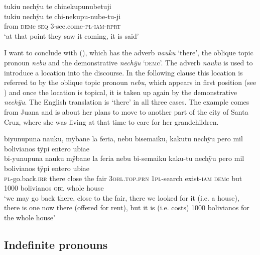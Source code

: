 \ea\label{ex:demC-3}
\begingl
\glpreamble tukiu nechÿu te chinekupunubetuji\\
\gla tukiu nechÿu te chi-nekupu-nube-tu-ji\\
\glb from \textsc{dem}c \textsc{seq} 3-see.come-\textsc{pl}-\textsc{iam}-\textsc{rprt}\\
\glft ‘at that point they saw it coming, it is said’
\endgl
\trailingcitation{[jxx-p151016l-2.110]}
\xe


I want to conclude with (), which has the adverb \textit{nauku} ‘there’, the oblique topic pronoun \textit{nebu} and the demonstrative \textit{nechÿu} ‘\textsc{dem}c’. The adverb \textit{nauku} is used to introduce a location into the discourse. In the following clause this location is referred to by the oblique topic pronoun \textit{nebu}, which appears in first position (see ) and once the location is topical, it is taken up again by the demonstrative \textit{nechÿu}. The English translation is ‘there’ in all three cases. The example comes from Juana and is about her plans to move to another part of the city of Santa Cruz, where she was living at that time to care for her grandchildren.

\ea\label{ex:demC-2}
\begingl
\glpreamble biyunupuna nauku, mÿbane la feria, nebu bisemaiku, kakutu nechÿu pero mil bolivianos tÿpi entero ubiae\\
\gla bi-yunupuna nauku mÿbane {la feria} nebu bi-semaiku kaku-tu nechÿu pero mil bolivianos tÿpi entero ubiae\\
\textsc{pl}-go.back.\textsc{irr} there close {the fair} 3\textsc{obl.top.prn} 1\textsc{pl}-search exist-\textsc{iam} \textsc{dem}c but 1000 bolivianos \textsc{obl} whole house\\
\glft ‘we may go back there, close to the fair, there we looked for it (i.e. a house), there is one now there (offered for rent), but it is (i.e. costs) 1000 bolivianos for the whole house’
\endgl
\trailingcitation{[jxx-p120430l-1.365-369]}
\xe




\largerpage
\subsection{Indefinite pronouns}\label{sec:IndefinitePronouns}

